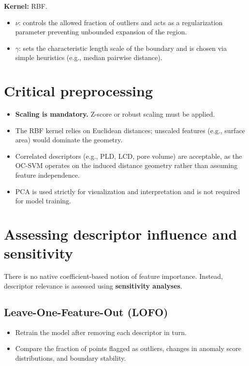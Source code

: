 \documentclass[11pt]{article}
\begin{document}
\noindent\textbf{Kernel:} RBF.
\begin{itemize}
\item $\nu$: controls the allowed fraction of outliers and acts as a regularization parameter preventing unbounded expansion of the region.
\item $\gamma$: sets the characteristic length scale of the boundary and is chosen via simple heuristics (e.g., median pairwise distance).
\end{itemize}

\section{Critical preprocessing}

\begin{itemize}
\item \textbf{Scaling is mandatory.} Z-score or robust scaling must be applied.
\item The RBF kernel relies on Euclidean distances; unscaled features (e.g., surface area) would dominate the geometry.
\item Correlated descriptors (e.g., PLD, LCD, pore volume) are acceptable, as the OC-SVM operates on the induced distance geometry rather than assuming feature independence.
\item PCA is used strictly for visualization and interpretation and is not required for model training.
\end{itemize}

\section{Assessing descriptor influence and sensitivity}

There is no native coefficient-based notion of feature importance. Instead, descriptor relevance is assessed using \textbf{sensitivity analyses}.

\subsection{Leave-One-Feature-Out (LOFO)}
\begin{itemize}
\item Retrain the model after removing each descriptor in turn.
\item Compare the fraction of points flagged as outliers, changes in anomaly score distributions, and boundary stability.
\end{itemize}
\end{document}
